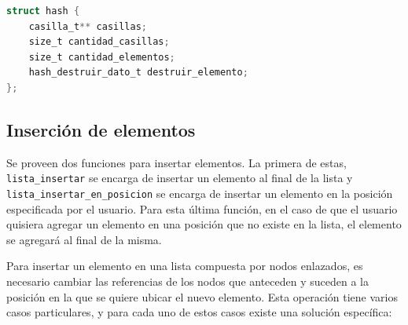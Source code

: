 \documentclass[titlepage,a4paper]{article}
\begin{document}
\begin{lstlisting}[language=C]
struct hash {
	casilla_t** casillas;
	size_t cantidad_casillas;
	size_t cantidad_elementos;
	hash_destruir_dato_t destruir_elemento;
};
\end{lstlisting}

											\subsection{Inserción de elementos}

Se proveen dos funciones para insertar elementos. La primera de estas,
\lstinline{lista_insertar} se encarga de insertar un elemento al final de la
lista y \lstinline{lista_insertar_en_posicion} se encarga de insertar un
elemento en la posición especificada por el usuario. Para esta última función,
en el caso de que el usuario quisiera agregar un elemento en una posición que
no existe en la lista, el elemento se agregará al final de la misma.

Para insertar un elemento en una lista compuesta por nodos enlazados, es
necesario cambiar las referencias de los nodos que anteceden y suceden a la
posición en la que se quiere ubicar el nuevo elemento. Esta operación tiene
varios casos particulares, y para cada uno de estos casos existe una solución
específica:
\end{document}
